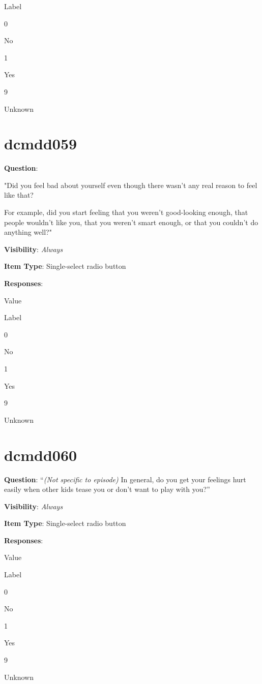 \documentclass[]{book}
\begin{document}
Label

0

No

1

Yes

9

Unknown

\hypertarget{dcmdd059}{%
\section{dcmdd059}\label{dcmdd059}}

\textbf{Question}:

"Did you feel bad about yourself even though there wasn't any real reason to feel like that?

For example, did you start feeling that you weren't good-looking enough, that people wouldn't like you, that you weren't smart enough, or that you couldn't do anything well?"

\textbf{Visibility}: \emph{Always}

\textbf{Item Type}: Single-select radio button

\textbf{Responses}:

Value

Label

0

No

1

Yes

9

Unknown

\hypertarget{dcmdd060}{%
\section{dcmdd060}\label{dcmdd060}}

\textbf{Question}: ``\emph{(Not specific to episode)} In general, do you get your feelings hurt easily when other kids tease you or don't want to play with you?''

\textbf{Visibility}: \emph{Always}

\textbf{Item Type}: Single-select radio button

\textbf{Responses}:

Value

Label

0

No

1

Yes

9

Unknown
\end{document}
